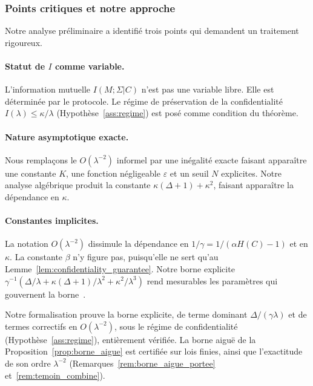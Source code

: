 \begin{sloppypar}
\subsubsection{Points critiques et notre approche}
\label{subsubsec:points_critiques}

Notre analyse pr\'eliminaire a identifi\'e trois points qui demandent un
traitement rigoureux.

\paragraph{Statut de $I$ comme variable.}
L'information mutuelle $I(M;\Sigma|C)$ n'est pas une variable libre. Elle
est d\'etermin\'ee par le protocole. Le r\'egime de pr\'eservation de la
confidentialit\'e $I(\lambda) \le \kappa/\lambda$ (Hypoth\`ese~\ref{ass:regime})
est pos\'e comme condition du th\'eor\`eme.

\paragraph{Nature asymptotique exacte.}
Nous rempla\c{c}ons le $O(\lambda^{-2})$ informel par une in\'egalit\'e
exacte faisant appara\^itre une constante $K$, une fonction
n\'egligeable $\varepsilon$ et un seuil $N$ explicites. Notre analyse
alg\'ebrique produit la constante $\kappa(\Delta+1) + \kappa^2$,
faisant appara\^itre la d\'ependance en $\kappa$.

\paragraph{Constantes implicites.}
La notation $O(\lambda^{-2})$ dissimule la d\'ependance en
$1/\gamma = 1/(\alpha H(C) - 1)$ et en $\kappa$. La constante $\beta$ n'y figure pas,
puisqu'elle ne sert qu'au Lemme~\ref{lem:confidentiality_guarantee}. Notre borne explicite
$\gamma^{-1}(\Delta/\lambda + \kappa(\Delta+1)/\lambda^2 + \kappa^2/\lambda^3)$
rend mesurables les param\`etres qui gouvernent la borne~\cite{Grossklags10,Herley09}.

Notre formalisation prouve la borne explicite, de terme dominant
$\Delta/(\gamma\lambda)$ et de termes correctifs en $O(\lambda^{-2})$, sous le r\'egime de
confidentialit\'e (Hypoth\`ese~\ref{ass:regime}), enti\`erement v\'erifi\'ee. La borne aigu\"e
de la Proposition~\ref{prop:borne_aigue} est certifi\'ee sur lois finies, ainsi que l'exactitude
de son ordre $\lambda^{-2}$ (Remarques~\ref{rem:borne_aigue_portee} et~\ref{rem:temoin_combine}).


\end{sloppypar}
